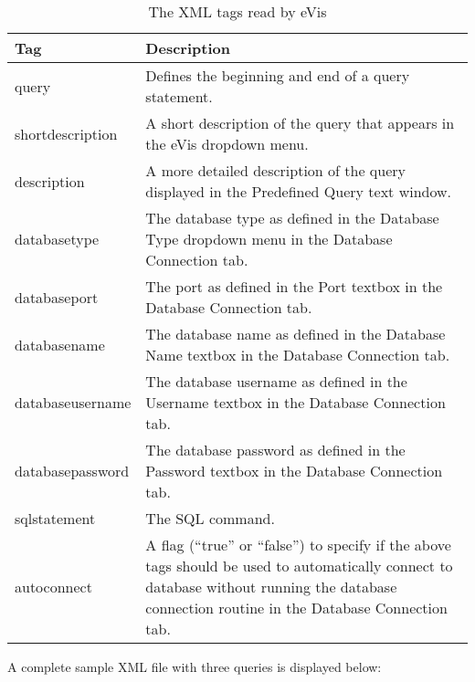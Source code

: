 \label{evis_xml_format}

\begin{table}[htp]
\centering
\caption{The XML tags read by eVis}\label{tab:evis_xml_tags}\medskip
 \begin{tabular}{|p{1.2in}|p{4.7in}|}
 \hline \textbf{Tag} & \textbf{Description}\\
 \hline query & Defines the beginning and end of a query statement.\\
 \hline shortdescription & A short description of the query that appears in the eVis dropdown
menu.\\
 \hline description & A more detailed description of the query displayed in the Predefined Query
text window.\\
 \hline databasetype & The database type as defined in the Database Type dropdown menu in the
Database Connection tab.\\
 \hline databaseport & The port as defined in the Port textbox in the Database Connection tab.\\
 \hline databasename & The database name as defined in the Database Name textbox in the Database
Connection tab.\\
 \hline databaseusername & The database username as defined in the Username textbox in the Database
Connection tab.\\
 \hline databasepassword & The database password as defined in the Password textbox in the Database
Connection tab.\\
 \hline sqlstatement & The SQL command.\\
 \hline autoconnect & A flag (``true'' or ``false'') to specify if the above tags should be used to
automatically connect to database without running the database connection routine in the Database
Connection tab.\\
 \hline
\end{tabular}
\end{table}

A complete sample XML file with three queries is displayed below:

